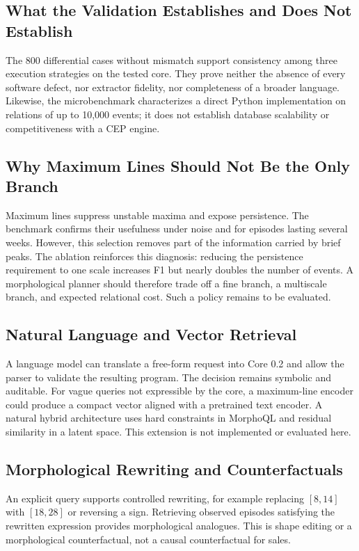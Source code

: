 \subsection{What the Validation Establishes and Does Not Establish}

The 800 differential cases without mismatch support consistency among three execution strategies on the tested core. They prove neither the absence of every software defect, nor extractor fidelity, nor completeness of a broader language. Likewise, the microbenchmark characterizes a direct Python implementation on relations of up to 10,000 events; it does not establish database scalability or competitiveness with a CEP engine.

\subsection{Why Maximum Lines Should Not Be the Only Branch}

Maximum lines suppress unstable maxima and expose persistence. The benchmark confirms their usefulness under noise and for episodes lasting several weeks. However, this selection removes part of the information carried by brief peaks. The ablation reinforces this diagnosis: reducing the persistence requirement to one scale increases F1 but nearly doubles the number of events. A morphological planner should therefore trade off a fine branch, a multiscale branch, and expected relational cost. Such a policy remains to be evaluated.

\subsection{Natural Language and Vector Retrieval}

A language model can translate a free-form request into Core 0.2 and allow the parser to validate the resulting program. The decision remains symbolic and auditable. For vague queries not expressible by the core, a maximum-line encoder could produce a compact vector aligned with a pretrained text encoder. A natural hybrid architecture uses hard constraints in MorphoQL and residual similarity in a latent space. This extension is not implemented or evaluated here.

\subsection{Morphological Rewriting and Counterfactuals}

An explicit query supports controlled rewriting, for example replacing $[8,14]$ with $[18,28]$ or reversing a sign. Retrieving observed episodes satisfying the rewritten expression provides morphological analogues. This is shape editing or a morphological counterfactual, not a causal counterfactual for sales.

